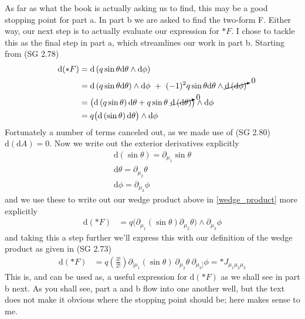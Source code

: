 As far as what the book is actually asking us to find, this may be a good stopping point for part a. In part b we are asked to find the two-form F. Either way, our next step is to actually evaluate our expression for $\ast F$. I chose to tackle this as the final step in part a, which streamlines our work in part b. Starting from (SG 2.78) 
%
\begin{align}
	\textrm{d} (\ast F) &= \textrm{d} \left( q  \sin{\theta}  \textrm{d} \theta  \wedge  \textrm{d} \phi \right)\\
	 &= \textrm{d} \left( q  \sin{\theta}  \textrm{d} \theta \right)  \wedge  \textrm{d} \phi \ + \ (-1)^2 q  \sin{\theta}  \textrm{d} \theta \wedge \cancelto{0}{\textrm{d} \left(\textrm{d} \phi\right)}\\
	 &= \big( \textrm{d}  \left( q  \sin{\theta} \right)  \textrm{d} \theta + q  \sin{\theta} \ \cancelto{0}{\textrm{d} \left( \textrm{d} \theta \right)} \big) \wedge  \textrm{d} \phi\\
	 \label{wedge_product}&= q \big( \textrm{d} \left(\sin{\theta} \right)  \textrm{d} \theta \big) \wedge  \textrm{d} \phi
\end{align} 
%
Fortunately a number of terms canceled out, as we made use of (SG 2.80) $\textrm{d} \left( \textrm{d} A \right) = 0$. Now we write out the exterior derivatives explicitly
%
\begin{align}
\textrm{d} \left(\sin{\theta} \right) = \partial_{\mu_1} \sin{\theta} \\
\textrm{d} \theta = \partial_{\mu_2} \theta\\
\textrm{d} \phi = \partial_{\mu_3}\phi
\end{align} 
%
and we use these to write out our wedge product above in \ref{wedge_product} more explicitly
%
\begin{align}
 \textrm{d} (\ast F) &= q \big( \partial_{\mu_1} \left(\sin{\theta}\right)  \partial_{\mu_2} \theta \big) \wedge  \partial_{\mu_3}\phi
\end{align} 
%
and taking this a step further we'll express this with our definition of the wedge product as given in (SG 2.73)
%
\begin{align}
	\textrm{d} (\ast F) &= q \left( \frac{3!}{2!} \right)\partial_{[\mu_1} \left(\sin{\theta}\right) \ \partial_{\mu_2} \theta \ \partial_{\mu_3]}\phi = \ast J_{\mu_1\mu_2\mu_3} 
\end{align} 
%
This is, and can be used as, a useful expression for $\textrm{d} (\ast F)$ as we shall see in part b next. As you shall see, part a and b flow into one another well, but the text does not make it obvious where the stopping point should be; here makes sense to me. 


